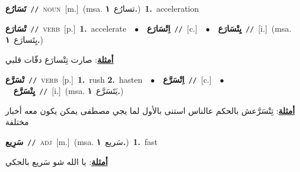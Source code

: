 \documentclass[10pt,a4paper,twoside]{article} %
\begin{document}
\begin{multicols}{2}
{\setlength\topsep{0pt}\textbf{\foreignlanguage{arabic}{تَسَارُع}}\ {\color{gray}\texttt{//}\color{black}}\ \textsc{noun}\ [m.]\ \color{gray}(msa. \foreignlanguage{arabic}{تسارُع}~\foreignlanguage{arabic}{\textbf{١.}})\color{black}\ \textbf{1.}~acceleration\ } \vspace{2mm}

{\setlength\topsep{0pt}\textbf{\foreignlanguage{arabic}{تْسَارَع}}\ {\color{gray}\texttt{//}\color{black}}\ \textsc{verb}\ [p.]\ \textbf{1.}~accelerate\ \ $\bullet$\ \ \setlength\topsep{0pt}\textbf{\foreignlanguage{arabic}{اِتْسَارَع}}\ {\color{gray}\texttt{//}\color{black}}\ [c.]\ \ $\bullet$\ \ \setlength\topsep{0pt}\textbf{\foreignlanguage{arabic}{يِتْسَارَع}}\ {\color{gray}\texttt{//}\color{black}}\ [i.]\ \color{gray}(msa. \foreignlanguage{arabic}{يِتَسارَع}~\foreignlanguage{arabic}{\textbf{١.}})\color{black}\  \begin{flushright}\color{gray}\foreignlanguage{arabic}{\textbf{\underline{\foreignlanguage{arabic}{أمثلة}}}: صارت تِتْسارَع دقّات قلبي}\end{flushright}\color{black}} \vspace{2mm}

{\setlength\topsep{0pt}\textbf{\foreignlanguage{arabic}{تْسَرَّع}}\ {\color{gray}\texttt{//}\color{black}}\ \textsc{verb}\ [p.]\ \textbf{1.}~rush  \textbf{2.}~hasten\ \ $\bullet$\ \ \setlength\topsep{0pt}\textbf{\foreignlanguage{arabic}{اِتْسَرَّع}}\ {\color{gray}\texttt{//}\color{black}}\ [c.]\ \ $\bullet$\ \ \setlength\topsep{0pt}\textbf{\foreignlanguage{arabic}{يِتْسَرَّع}}\ {\color{gray}\texttt{//}\color{black}}\ [i.]\ \color{gray}(msa. \foreignlanguage{arabic}{يَتَسَرَّع}~\foreignlanguage{arabic}{\textbf{١.}})\color{black}\  \begin{flushright}\color{gray}\foreignlanguage{arabic}{\textbf{\underline{\foreignlanguage{arabic}{أمثلة}}}: تِتْسَرَّعش بالحكم عالناس استنى بالأول لما يجي مصطفى يمكن يكون معه أخبار مختلفة}\end{flushright}\color{black}} \vspace{2mm}

{\setlength\topsep{0pt}\textbf{\foreignlanguage{arabic}{سَرِيع}}\ {\color{gray}\texttt{//}\color{black}}\ \textsc{adj}\ [m.]\ \color{gray}(msa. \foreignlanguage{arabic}{سَريع}~\foreignlanguage{arabic}{\textbf{١.}})\color{black}\ \textbf{1.}~fast\  \begin{flushright}\color{gray}\foreignlanguage{arabic}{\textbf{\underline{\foreignlanguage{arabic}{أمثلة}}}: يا الله شو سَريع بالحكي}\end{flushright}\color{black}} \vspace{2mm}


\end{multicols}
\end{document}
